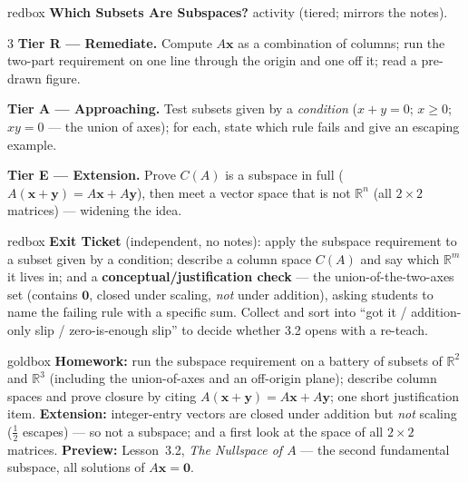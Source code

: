 \documentclass[10pt]{article}
\newcommand{\xx}{\mathbf{x}}
\newcommand{\yy}{\mathbf{y}}
\newcommand{\zero}{\mathbf{0}}
\begin{document}
\begin{skillbox}{redbox}
\textbf{Which Subsets Are Subspaces?} activity (tiered; mirrors the notes).
\begin{multicols}{3}
\textbf{Tier R --- Remediate.} Compute $A\xx$ as a combination of columns; run the two-part
requirement on one line through the origin and one off it; read a pre-drawn figure.

\columnbreak
\textbf{Tier A --- Approaching.} Test subsets given by a \emph{condition} ($x+y=0$; $x\ge 0$;
$xy=0$ --- the union of axes); for each, state which rule fails and give an escaping example.

\columnbreak
\textbf{Tier E --- Extension.} Prove $C(A)$ is a subspace in full ($A(\xx+\yy)=A\xx+A\yy$), then
meet a vector space that is not $\mathbb{R}^n$ (all $2\times2$ matrices) --- widening the idea.
\end{multicols}
\end{skillbox}

\begin{skillbox}{redbox}
\textbf{Exit Ticket} (independent, no notes): apply the subspace requirement to a subset given by a
condition; describe a column space $C(A)$ and say which $\mathbb{R}^m$ it lives in; and a
\textbf{conceptual/justification check} --- the union-of-the-two-axes set (contains $\zero$, closed
under scaling, \emph{not} under addition), asking students to name the failing rule with a specific
sum. Collect and sort into ``got it / addition-only slip / zero-is-enough slip'' to decide whether
3.2 opens with a re-teach.
\end{skillbox}

\begin{skillbox}{goldbox}
\textbf{Homework:} run the subspace requirement on a battery of subsets of $\mathbb{R}^2$ and
$\mathbb{R}^3$ (including the union-of-axes and an off-origin plane); describe column spaces and
prove closure by citing $A(\xx+\yy)=A\xx+A\yy$; one short justification item. \textbf{Extension:}
integer-entry vectors are closed under addition but \emph{not} scaling ($\tfrac12$ escapes) --- so
not a subspace; and a first look at the space of all $2\times2$ matrices. \textbf{Preview:}
Lesson~3.2, \emph{The Nullspace of $A$} --- the second fundamental subspace, all solutions of
$A\xx=\zero$.
\end{skillbox}
\end{document}

